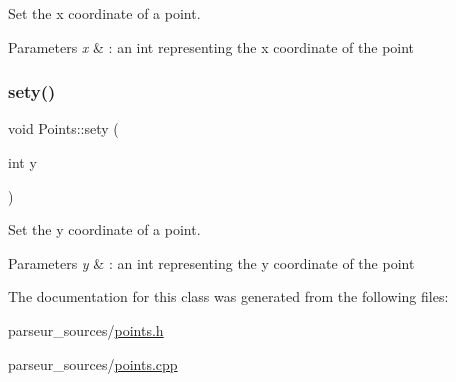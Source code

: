 Set the x coordinate of a point. 


\begin{DoxyParams}{Parameters}
{\em x} & \+: an int representing the x coordinate of the point \\
\hline
\end{DoxyParams}
\mbox{\label{class_points_a54f8ad58213ae7284f091f2a117236f3}} 
\subsubsection{\texorpdfstring{sety()}{sety()}}
{\footnotesize\ttfamily void Points\+::sety (\begin{DoxyParamCaption}\item[{int}]{y }\end{DoxyParamCaption})}



Set the y coordinate of a point. 


\begin{DoxyParams}{Parameters}
{\em y} & \+: an int representing the y coordinate of the point \\
\hline
\end{DoxyParams}


The documentation for this class was generated from the following files\+:\begin{DoxyCompactItemize}
\item 
parseur\+\_\+sources/\hyperlink{points_8h}{points.\+h}\item 
parseur\+\_\+sources/\hyperlink{points_8cpp}{points.\+cpp}\end{DoxyCompactItemize}
